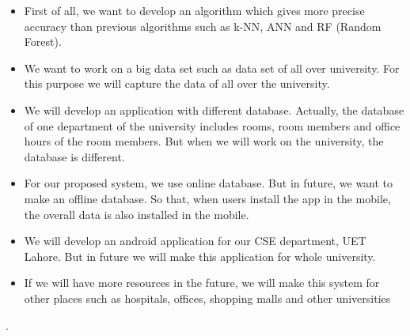 \begin{itemize}
\item First of all, we want to develop an algorithm which gives more precise accuracy than previous algorithms such as k-NN, ANN and RF (Random Forest). 
\item We want to work on a big data set such as data set of all over university. For this purpose we will capture the data of all over the university.
\item We will develop an application with different database. Actually, the database of one department of the university includes rooms, room members and office hours of the room members. But when we will work on the university, the database is different.
\item For our proposed system, we use online database. But in future, we want to make an offline database. So that, when users install the app in the mobile, the overall data is also installed in the mobile.
\item We will develop an android application for our CSE department, UET Lahore. But in future we will make this application for whole university.
\item If we will have more resources in the future, we will make this system for other places such as hospitals, offices, shopping malls and other universities
\end{itemize}.



